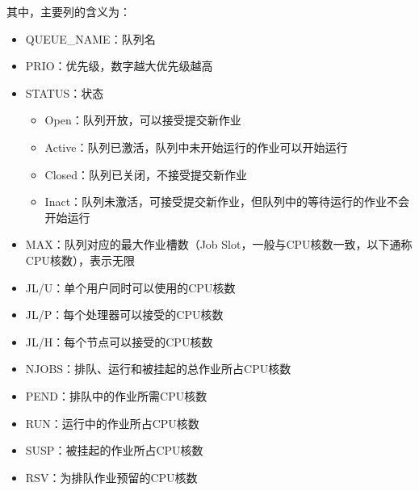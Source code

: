 \documentclass[a4paper,12pt,english]{sphinxmanual}
\begin{document}
\sphinxAtStartPar
其中，主要列的含义为：
\begin{itemize}
\item {} 
\sphinxAtStartPar
QUEUE\_NAME：队列名

\item {} 
\sphinxAtStartPar
PRIO：优先级，数字越大优先级越高

\item {} 
\sphinxAtStartPar
STATUS：状态
\begin{itemize}
\item {} 
\sphinxAtStartPar
Open：队列开放，可以接受提交新作业

\item {} 
\sphinxAtStartPar
Active：队列已激活，队列中未开始运行的作业可以开始运行

\item {} 
\sphinxAtStartPar
Closed：队列已关闭，不接受提交新作业

\item {} 
\sphinxAtStartPar
Inact：队列未激活，可接受提交新作业，但队列中的等待运行的作业不会开始运行

\end{itemize}

\item {} 
\sphinxAtStartPar
MAX：队列对应的最大作业槽数（Job
Slot，一般与CPU核数一致，以下通称CPU核数），\sphinxhyphen{}表示无限

\item {} 
\sphinxAtStartPar
JL/U：单个用户同时可以使用的CPU核数

\item {} 
\sphinxAtStartPar
JL/P：每个处理器可以接受的CPU核数

\item {} 
\sphinxAtStartPar
JL/H：每个节点可以接受的CPU核数

\item {} 
\sphinxAtStartPar
NJOBS：排队、运行和被挂起的总作业所占CPU核数

\item {} 
\sphinxAtStartPar
PEND：排队中的作业所需CPU核数

\item {} 
\sphinxAtStartPar
RUN：运行中的作业所占CPU核数

\item {} 
\sphinxAtStartPar
SUSP：被挂起的作业所占CPU核数

\item {} 
\sphinxAtStartPar
RSV：为排队作业预留的CPU核数

\end{itemize}
\end{document}
